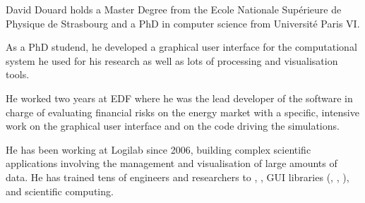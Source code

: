 \begin{participant}[type=PI,PM=6,gender=male]{David Douard}
  holds a Master Degree from the Ecole Nationale Sup\'{e}rieure de Physique de
  Strasbourg and a PhD in computer science from Universit\'{e} Paris VI.

  As a PhD studend, he developed a graphical user interface for the
  computational system he used for his research as well as lots of processing
  and visualisation tools.

  He worked two years at EDF where he was the lead developer of the software in
  charge of evaluating financial risks on the energy market with a specific,
  intensive work on the graphical user interface and on the code driving the
  simulations.

  He has been working at Logilab since 2006, building complex scientific
  applications involving the management and visualisation of large amounts of
  data. He has trained tens of engineers and researchers to ,
  \Python, GUI libraries (, , ),
   and scientific computing.
\end{participant}
